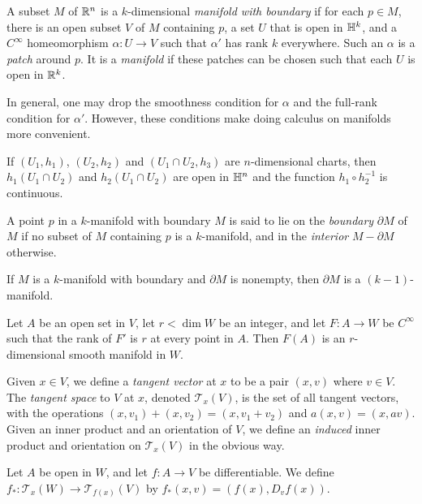 \begin{defn}
    A subset $M$ of $\mathbb{R}^n$ is a $k$-dimensional \emph{manifold with boundary}
    if for each $p\in M$, there is an open subset $V$ of $M$ containing $p$, a
    set $U$ that is open in $\mathbb{H}^k$, and a $C^\infty$ homeomorphism $\alpha:U\to
    V$ such that $\alpha'$ has rank $k$ everywhere. Such an $\alpha$ is a
    \emph{patch} around $p$. It is a \emph{manifold} if these
    patches can be chosen such that each $U$ is open in $\mathbb{R}^k$.
\end{defn}
\begin{rem}
    In general, one may drop the smoothness condition for $\alpha$ and the
    full-rank condition for $\alpha'$. However, these conditions make doing
    calculus on manifolds more convenient.
\end{rem}
\begin{prop}
    If $(U_1,h_1)$, $(U_2,h_2)$ and $(U_1\cap U_2,h_3)$ are $n$-dimensional
    charts, then $h_1(U_1\cap U_2)$ and $h_2(U_1\cap U_2)$ are
    open in $\mathbb{H}^n$ and the function $h_1\circ h_2^{-1}$ is continuous.
\end{prop}
\begin{defn}
    A point $p$ in a $k$-manifold with boundary $M$ is said to lie on the
    \emph{boundary} $\partial M$ of $M$ if no subset of $M$ containing $p$ is a
    $k$-manifold, and in the \emph{interior} $M-\partial M$ otherwise.
\end{defn}
\begin{prop}
    If $M$ is a $k$-manifold with boundary and $\partial M$ is nonempty, then
    $\partial M$ is a $(k-1)$-manifold.
\end{prop}
\begin{thm}
    Let $A$ be an open set in $V$, let $r<\dim W$ be an integer, and let
    $F:A\to W$ be $C^\infty$ such that the rank of $F'$ is $r$ at every point in $A$.
    Then $F(A)$ is an $r$-dimensional smooth manifold in $W$.
\end{thm}
\begin{defn}
    Given $x\in V$, we define a \emph{tangent vector} at $x$ to be a pair
    $(x,v)$ where $v\in V$. The \emph{tangent space} to $V$ at $x$, denoted
    $\mathcal T_x(V)$, is the set of
    all tangent vectors, with the operations $(x,v_1)+(x,v_2)=(x,v_1+v_2)$ and
    $a(x,v)=(x,av)$. Given an inner product and an orientation of $V$, we define
    an \emph{induced} inner product and orientation on $\mathcal T_x(V)$ in the
    obvious way.
\end{defn}
\begin{defn}
    Let $A$ be open in $W$, and let $f:A\to V$ be differentiable. We define
    $f_*:\mathcal T_x(W)\to\mathcal T_{f(x)}(V)$ by 
    $f_*(x,v)=(f(x),D_v f(x))$. 
\end{defn}
